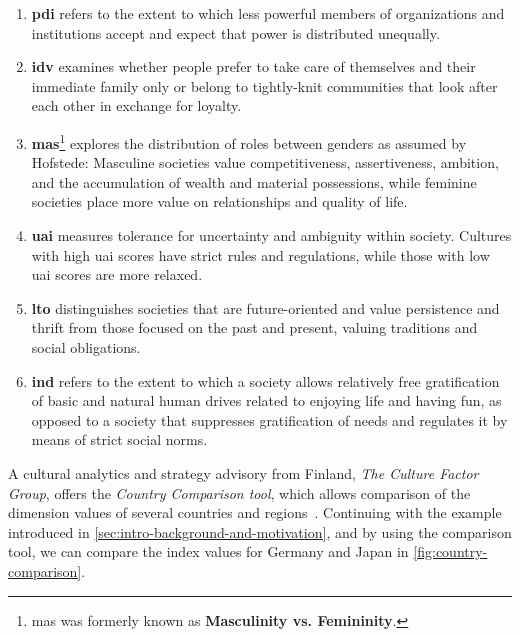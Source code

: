 \begin{enumerate}
    \item \textbf{\ac{pdi}} refers to the extent to which less powerful members of organizations and institutions accept and expect that power is distributed unequally.

    \item \textbf{\ac{idv}} examines whether people prefer to take care of themselves and their immediate family only or belong to tightly-knit communities that look after each other in exchange for loyalty.

    \item \textbf{\ac{mas}}\footnote{\ac{mas} was formerly known as \textbf{Masculinity vs. Femininity}.} explores the distribution of roles between genders as assumed by Hofstede: Masculine societies value competitiveness, assertiveness, ambition, and the accumulation of wealth and material possessions, while feminine societies place more value on relationships and quality of life.

    \item \textbf{\ac{uai}} measures tolerance for uncertainty and ambiguity within society.
    Cultures with high \ac{uai} scores have strict rules and regulations, while those with low \ac{uai} scores are more relaxed.

    \item \textbf{\ac{lto}} distinguishes societies that are future-oriented and value persistence and thrift from those focused on the past and present, valuing traditions and social obligations.

    \item \textbf{\ac{ind}} refers to the extent to which a society allows relatively free gratification of basic and natural human drives related to enjoying life and having fun, as opposed to a society that suppresses gratification of needs and regulates it by means of strict social norms.
\end{enumerate}

A cultural analytics and strategy advisory from Finland, \textit{The Culture Factor Group}, offers the \textit{Country Comparison tool}, which allows comparison of the dimension values of several countries and regions~\cite{CFG2024}.
Continuing with the example introduced in \cref{sec:intro-background-and-motivation}, and by using the comparison tool, we can compare the index values for Germany and Japan in \cref{fig:country-comparison}.

